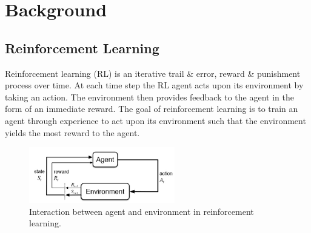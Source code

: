 \documentclass[10pt,journal,compsoc]{IEEEtran}
\begin{document}
%






\section{Background}
\subsection{Reinforcement Learning}
Reinforcement learning (RL) is an iterative trail \& error, reward \& punishment process over time. At each time step the RL agent acts upon its environment by taking an action. The environment then provides feedback to the agent in the form of an immediate reward. The goal of reinforcement learning is to train an agent through experience to act upon its environment such that the environment yields the most reward to the agent.
\begin{figure}[!h]
\centering
\includegraphics[width=2.5in]{rl_process}
\caption{Interaction between agent and environment in reinforcement learning.}
\label{rl_process_loop}
\end{figure}
\end{document}
